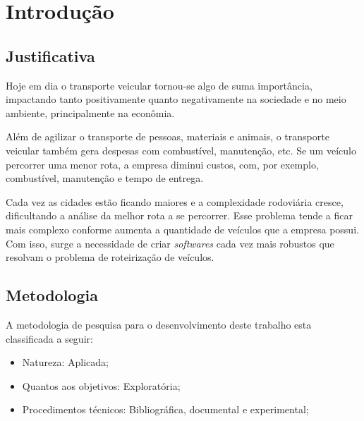 \documentclass{abnt}
\begin{document}

	\capa
	
	\folhaderosto
	

	
	\sumario 
	
	\listadetabelas
	
	\listadefiguras
	
	\chapter{Introdução}

	

	\section{Justificativa}
		
		Hoje em dia o transporte veicular tornou-se algo de suma importância, 
		impactando tanto positivamente quanto negativamente na sociedade e no meio ambiente, principalmente na econômia. 
		
		Além de agilizar o transporte de pessoas, materiais e animais, 
		o transporte veicular também gera despesas com combustível, manutenção, etc. 
		Se um veículo percorrer uma menor rota, a empresa diminui custos, com, por exemplo, 
		combustível, manutenção e tempo de entrega.

		Cada vez as cidades estão ficando maiores e a complexidade rodoviária cresce, dificultando a
		análise da melhor rota a se percorrer. Esse problema tende a ficar mais complexo conforme 
		aumenta a quantidade de veículos que a empresa possui. Com isso, surge a necessidade de criar 
		\textit{softwares} cada vez mais robustos que resolvam o problema de roteirização de veículos.

	\section{Metodologia}

		A metodologia de pesquisa para o desenvolvimento deste trabalho esta classificada a seguir:
		\begin{itemize}
			\item Natureza: Aplicada;
			\item Quantos aos objetivos: Exploratória;
			\item Procedimentos técnicos: Bibliográfica, documental e experimental;
		\end{itemize}
	
\end{document}

